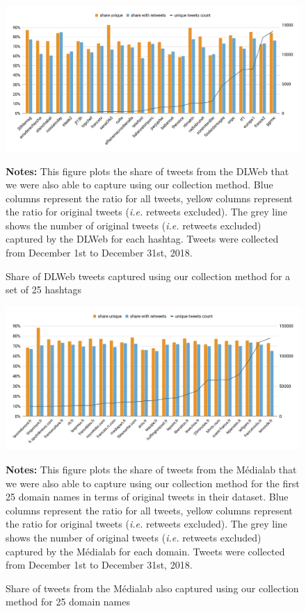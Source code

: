 \begin{figure}[h]
\begin{center}
\includegraphics[width=1\textwidth]{figures/Beatrice/ShareinCommonWithDL.pdf}
\end{center}
\scriptsize \textbf{Notes:} This figure plots the share of tweets from the DLWeb that we were also able to capture using our collection method. Blue columns represent the ratio for all tweets, yellow columns represent the ratio for original tweets (\textit{i.e.} retweets excluded). The grey line shows the number of original tweets (\textit{i.e.} retweets excluded) captured by the DLWeb for each hashtag. Tweets were collected from December 1st to December 31st, 2018.
\caption{Share of DLWeb tweets captured using our collection method for a set of 25 hashtags}
\label{Figure:HistogramHashtagsDLWeb}
\end{figure}


\begin{figure}[h]
\begin{center}
\includegraphics[width=1\textwidth]{figures/Beatrice/ShareInCommonWithMedialab.pdf}
\end{center}
\scriptsize \textbf{Notes:} This figure plots the share of tweets from the Médialab that we were also able to capture using our collection method for the first 25 domain names in terms of original tweets in their dataset. Blue columns represent the ratio for all tweets, yellow columns represent the ratio for original tweets (\textit{i.e.} retweets excluded). The grey line shows the number of original tweets (\textit{i.e.} retweets excluded) captured by the Médialab for each domain. Tweets were collected from December 1st to December 31st, 2018.
\caption{Share of tweets from the Médialab also captured using our collection method for 25 domain names}
\label{Figure:HistogramUrlsMedialab}
\end{figure}

